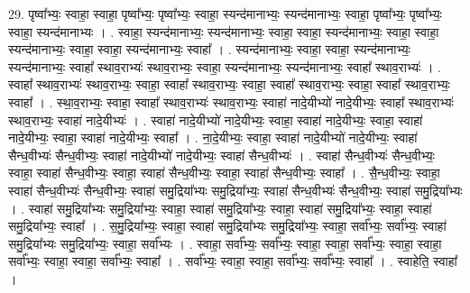 \documentclass[17pt]{extarticle}
\begin{document}
29. पृष्वा᳚भ्यः॒ स्वाहा॒ स्वाहा॒ पृष्वा᳚भ्यः॒ पृष्वा᳚भ्यः॒ स्वाहा॒ स्यन्द॑मानाभ्यः॒ स्यन्द॑मानाभ्यः॒ स्वाहा॒ पृष्वा᳚भ्यः॒ पृष्वा᳚भ्यः॒ स्वाहा॒ स्यन्द॑मानाभ्यः । . स्वाहा॒ स्यन्द॑मानाभ्यः॒ स्यन्द॑मानाभ्यः॒ स्वाहा॒ स्वाहा॒ स्यन्द॑मानाभ्यः॒ स्वाहा॒ स्वाहा॒ स्यन्द॑मानाभ्यः॒ स्वाहा॒ स्वाहा॒ स्यन्द॑मानाभ्यः॒ स्वाहा᳚ । . स्यन्द॑मानाभ्यः॒ स्वाहा॒ स्वाहा॒ स्यन्द॑मानाभ्यः॒ स्यन्द॑मानाभ्यः॒ स्वाहा᳚ स्थाव॒राभ्यः॑ स्थाव॒राभ्यः॒ स्वाहा॒ स्यन्द॑मानाभ्यः॒ स्यन्द॑मानाभ्यः॒ स्वाहा᳚ स्थाव॒राभ्यः॑ । . स्वाहा᳚ स्थाव॒राभ्यः॑ स्थाव॒राभ्यः॒ स्वाहा॒ स्वाहा᳚ स्थाव॒राभ्यः॒ स्वाहा॒ स्वाहा᳚ स्थाव॒राभ्यः॒ स्वाहा॒ स्वाहा᳚ स्थाव॒राभ्यः॒ स्वाहा᳚ । . स्था॒व॒राभ्यः॒ स्वाहा॒ स्वाहा᳚ स्थाव॒राभ्यः॑ स्थाव॒राभ्यः॒ स्वाहा॑ नादे॒यीभ्यो॑ नादे॒यीभ्यः॒ स्वाहा᳚ स्थाव॒राभ्यः॑ स्थाव॒राभ्यः॒ स्वाहा॑ नादे॒यीभ्यः॑ । . स्वाहा॑ नादे॒यीभ्यो॑ नादे॒यीभ्यः॒ स्वाहा॒ स्वाहा॑ नादे॒यीभ्यः॒ स्वाहा॒ स्वाहा॑ नादे॒यीभ्यः॒ स्वाहा॒ स्वाहा॑ नादे॒यीभ्यः॒ स्वाहा᳚ । . ना॒दे॒यीभ्यः॒ स्वाहा॒ स्वाहा॑ नादे॒यीभ्यो॑ नादे॒यीभ्यः॒ स्वाहा॑ सैन्ध॒वीभ्यः॑ सैन्ध॒वीभ्यः॒ स्वाहा॑ नादे॒यीभ्यो॑ नादे॒यीभ्यः॒ स्वाहा॑ सैन्ध॒वीभ्यः॑ । . स्वाहा॑ सैन्ध॒वीभ्यः॑ सैन्ध॒वीभ्यः॒ स्वाहा॒ स्वाहा॑ सैन्ध॒वीभ्यः॒ स्वाहा॒ स्वाहा॑ सैन्ध॒वीभ्यः॒ स्वाहा॒ स्वाहा॑ सैन्ध॒वीभ्यः॒ स्वाहा᳚ । . सै॒न्ध॒वीभ्यः॒ स्वाहा॒ स्वाहा॑ सैन्ध॒वीभ्यः॑ सैन्ध॒वीभ्यः॒ स्वाहा॑ समु॒द्रिया᳚भ्यः समु॒द्रिया᳚भ्यः॒ स्वाहा॑ सैन्ध॒वीभ्यः॑ सैन्ध॒वीभ्यः॒ स्वाहा॑ समु॒द्रिया᳚भ्यः । . स्वाहा॑ समु॒द्रिया᳚भ्यः समु॒द्रिया᳚भ्यः॒ स्वाहा॒ स्वाहा॑ समु॒द्रिया᳚भ्यः॒ स्वाहा॒ स्वाहा॑ समु॒द्रिया᳚भ्यः॒ स्वाहा॒ स्वाहा॑ समु॒द्रिया᳚भ्यः॒ स्वाहा᳚ । . स॒मु॒द्रिया᳚भ्यः॒ स्वाहा॒ स्वाहा॑ समु॒द्रिया᳚भ्यः समु॒द्रिया᳚भ्यः॒ स्वाहा॒ सर्वा᳚भ्यः॒ सर्वा᳚भ्यः॒ स्वाहा॑ समु॒द्रिया᳚भ्यः समु॒द्रिया᳚भ्यः॒ स्वाहा॒ सर्वा᳚भ्यः । . स्वाहा॒ सर्वा᳚भ्यः॒ सर्वा᳚भ्यः॒ स्वाहा॒ स्वाहा॒ सर्वा᳚भ्यः॒ स्वाहा॒ स्वाहा॒ सर्वा᳚भ्यः॒ स्वाहा॒ स्वाहा॒ सर्वा᳚भ्यः॒ स्वाहा᳚ । . सर्वा᳚भ्यः॒ स्वाहा॒ स्वाहा॒ सर्वा᳚भ्यः॒ सर्वा᳚भ्यः॒ स्वाहा᳚ । . स्वाहेति॒ स्वाहा᳚ । \newline
\pagebreak
{}
\end{document}

